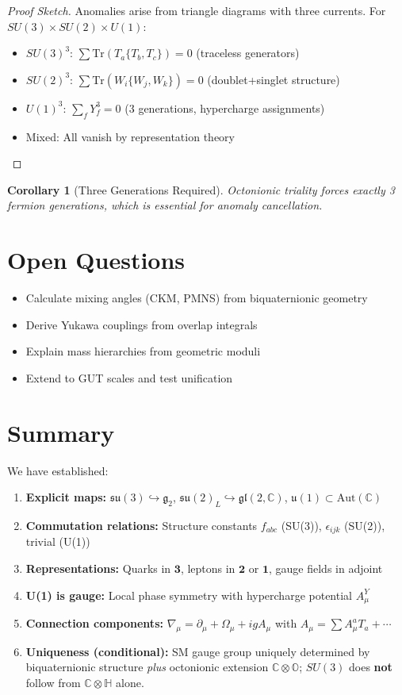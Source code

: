 \documentclass[12pt]{article}
\newtheorem{corollary}[definition]{Corollary}
\newcommand{\C}{\mathbb{C}}
\renewcommand{\H}{\mathbb{H}}
\renewcommand{\O}{\mathbb{O}}
\newcommand{\su}{\mathfrak{su}}
\newcommand{\gl}{\mathfrak{gl}}
\newcommand{\uu}{\mathfrak{u}}
\newcommand{\Aut}{\mathrm{Aut}}
\newcommand{\Tr}{\mathrm{Tr}}
\begin{document}
\begin{proof}[Proof Sketch]
Anomalies arise from triangle diagrams with three currents. For $SU(3) \times SU(2) \times U(1)$:
\begin{itemize}
\item $SU(3)^3$: $\sum \Tr(T_a\{T_b,T_c\}) = 0$ (traceless generators)
\item $SU(2)^3$: $\sum \Tr(W_i\{W_j,W_k\}) = 0$ (doublet+singlet structure)
\item $U(1)^3$: $\sum_f Y_f^3 = 0$ (3 generations, hypercharge assignments)
\item Mixed: All vanish by representation theory
\end{itemize}
\end{proof}

\begin{corollary}[Three Generations Required]
Octonionic triality forces exactly 3 fermion generations, which is essential for anomaly cancellation.
\end{corollary}

\section{Open Questions}

\begin{itemize}
\item[\textbf{TODO}] Calculate mixing angles (CKM, PMNS) from biquaternionic geometry
\item[\textbf{TODO}] Derive Yukawa couplings from overlap integrals
\item[\textbf{TODO}] Explain mass hierarchies from geometric moduli
\item[\textbf{TODO}] Extend to GUT scales and test unification
\end{itemize}

\section{Summary}

We have established:
\begin{enumerate}
\item \textbf{Explicit maps:} $\su(3) \hookrightarrow \mathfrak{g}_2$, $\su(2)_L \hookrightarrow \gl(2,\C)$, $\uu(1) \subset \Aut(\C)$
\item \textbf{Commutation relations:} Structure constants $f_{abc}$ (SU(3)), $\epsilon_{ijk}$ (SU(2)), trivial (U(1))
\item \textbf{Representations:} Quarks in $\mathbf{3}$, leptons in $\mathbf{2}$ or $\mathbf{1}$, gauge fields in adjoint
\item \textbf{U(1) is gauge:} Local phase symmetry with hypercharge potential $A_\mu^Y$
\item \textbf{Connection components:} $\nabla_\mu = \partial_\mu + \Omega_\mu + igA_\mu$ with $A_\mu = \sum A_\mu^a T_a + \cdots$
\item \textbf{Uniqueness (conditional):} SM gauge group uniquely determined by biquaternionic structure \emph{plus} octonionic extension $\C \otimes \O$; $SU(3)$ does \textbf{not} follow from $\C \otimes \H$ alone.
\end{enumerate}
\end{document}
